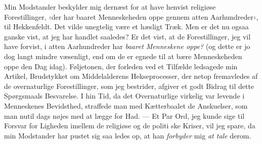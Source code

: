 \documentclass[12pt,a4paper,openany]{book}
\newcommand{\opage}[1]{\marginnote{\footnotesize\textit{[#1]}}}
\begin{document}
Min Modstander beskylder mig dernæst for at have henvist
religiøse Forestillinger, ‹der har baaret Menneskeheden oppe
gennem atten Aarhundreder›, til Hekkenfeldt. Det vilde unegtelig
være et hæsligt Træk. Men er det nu ogsaa ganske vist, at jeg
\opage{99}har handlet saaledes? Er det vist, at de Forestillinger, jeg vil
have forvist, i atten Aarhundreder har \emph{baaret Menneskene oppe?}
(og dette er jo dog langt mindre væsenligt, end om de er egnede
til at bære Menneskeheden oppe den Dag idag). Føljetonen, der
forleden ved et Tilfælde ledsagede min Artikel, Brudstykket om
Middelalderens Hekseprocesser, der netop fremavledes af de
overnaturlige Forestillinger, som jeg bestrider, afgiver et godt
Bidrag til dette Spørgsmaals Besvarelse. I hin Tid, da det
Overnaturlige virkelig var levende i Menneskenes Bevidsthed,
straffede man med Kætterbaalet de Anskuelser, som man nutil\-%
dags nøjes med at lægge for Had. --- Et Par Ord, jeg kunde
sige til Forsvar for Ligheden imellem de religiøse og de politi\-%
ske Kriser, vil jeg spare, da min Modstander har pustet sig saa\-%
ledes op, at han \emph{forbyder} mig \emph{at tale} derom.
\end{document}
